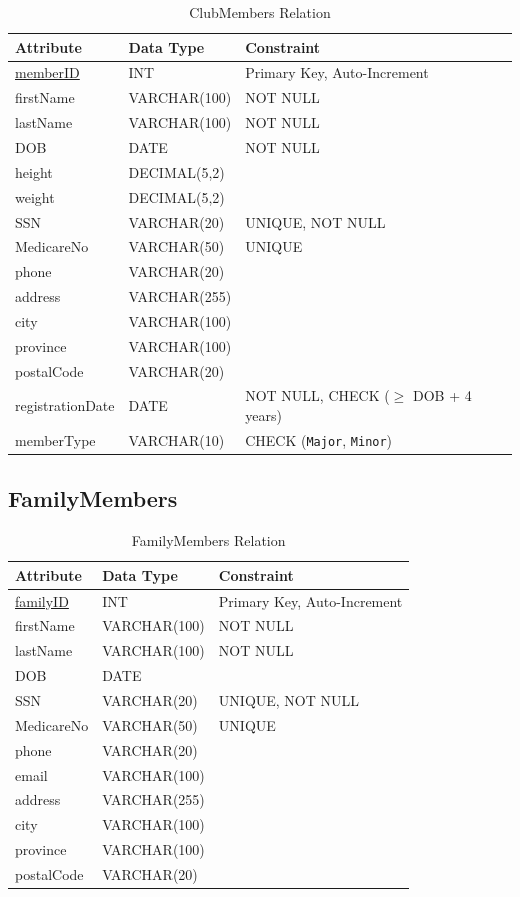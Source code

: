 \documentclass[11pt,a4paper]{article}
\begin{document}
\begin{table}[H]
\centering
\begin{tabular}{lll}
\toprule
Attribute & Data Type & Constraint \\
\midrule
\underline{memberID} & INT & Primary Key, Auto-Increment \\
firstName & VARCHAR(100) & NOT NULL \\
lastName & VARCHAR(100) & NOT NULL \\
DOB & DATE & NOT NULL \\
height & DECIMAL(5,2) & \\
weight & DECIMAL(5,2) & \\
SSN & VARCHAR(20) & UNIQUE, NOT NULL \\
MedicareNo & VARCHAR(50) & UNIQUE \\
phone & VARCHAR(20) & \\
address & VARCHAR(255) & \\
city & VARCHAR(100) & \\
province & VARCHAR(100) & \\
postalCode & VARCHAR(20) & \\
registrationDate & DATE & NOT NULL, CHECK ($\ge$ DOB + 4 years) \\
memberType & VARCHAR(10) & CHECK (\texttt{Major}, \texttt{Minor}) \\
\bottomrule
\end{tabular}
\caption{ClubMembers Relation}
\end{table}


\subsection{FamilyMembers}

\begin{table}[H]
\centering
\begin{tabular}{lll}
\toprule
Attribute & Data Type & Constraint \\
\midrule
\underline{familyID} & INT & Primary Key, Auto-Increment \\
firstName & VARCHAR(100) & NOT NULL \\
lastName & VARCHAR(100) & NOT NULL \\
DOB & DATE & \\
SSN & VARCHAR(20) & UNIQUE, NOT NULL \\
MedicareNo & VARCHAR(50) & UNIQUE \\
phone & VARCHAR(20) & \\
email & VARCHAR(100) & \\
address & VARCHAR(255) & \\
city & VARCHAR(100) & \\
province & VARCHAR(100) & \\
postalCode & VARCHAR(20) & \\
\bottomrule
\end{tabular}
\caption{FamilyMembers Relation}
\end{table}
\end{document}

